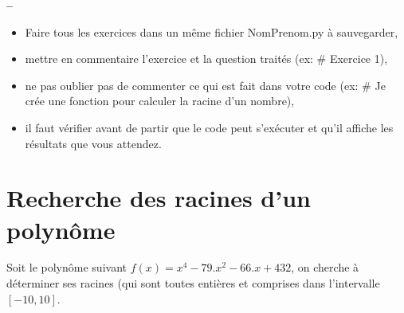 


\usepackage{enumitem}







\begin{center}
{\Large\bf {\type} \no {\numero} -- \descrip}
\end{center}


\begin{boxedminipage}{.9\textwidth} 
\begin{itemize}
 \item Faire tous les exercices dans un même fichier {NomPrenom.py} à sauvegarder,
 \item mettre en commentaire l'exercice et la question traités (ex: \# Exercice 1),
 \item ne pas oublier pas de commenter ce qui est fait dans votre code (ex: \# Je crée une fonction pour calculer la racine d'un nombre),
 \item il faut vérifier avant de partir que le code peut s'exécuter et qu'il affiche les résultats que vous attendez.
\end{itemize}
\end{boxedminipage}

\section*{Recherche des racines d'un polynôme}

Soit le polynôme suivant $f(x)=x^4-79.x^2-66.x+432$, on cherche à déterminer ses racines (qui sont toutes entières et comprises dans l'intervalle $\left[-10,10\right]$.

